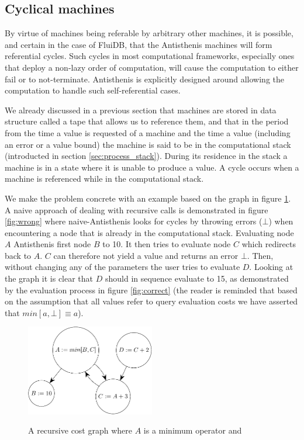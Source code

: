 \subsection{Cyclical machines}
\label{sec:cyclical_machines}

By virtue of machines being referable by arbitrary other machines, it
is possible, and certain in the case of FluiDB, that the Antisthenis
machines will form referential cycles. Such cycles in most
computational frameworks, especially ones that deploy a non-lazy order
of computation, will cause the computation to either fail or to
not-terminate. Antisthenis is explicitly designed around allowing the
computation to handle such self-referential cases.

We already discussed in a previous section that machines are stored in
data structure called a tape that allows us to reference them, and
that in the period from the time a value is requested of a machine and
the time a value (including an error or a value bound) the machine is
said to be in the computational stack (introducted in section
\ref{sec:process_stack}). During its residence in the stack a machine is
in a state where it is unable to produce a value. A cycle occurs when
a machine is referenced while in the computational stack.

We make the problem concrete with an example based on the graph in
figure \ref{fig:recur_package}. A naive approach of dealing with
recursive calls is demonstrated in figure \ref{fig:wrong} where
naive-Antisthenis looks for cycles by throwing errors (\(\bot\)) when
encountering a node that is already in the computational
stack. Evaluating node \(A\) Antisthenis first node \(B\) to 10. It
then tries to evaluate node \(C\) which redirects back to \(A\). \(C\)
can therefore not yield a value and returns an error \(\bot\). Then,
without changing any of the parameters the user tries to evaluate
\(D\). Looking at the graph it is clear that \(D\) should in sequence
evaluate to 15, as demonstrated by the evaluation process in figure
\ref{fig:correct} (the reader is reminded that based on the assumption
that all values refer to query evaluation costs we have asserted that
\(min[a,\bot] \equiv a\)).

\begin{figure}[H]
\centering
\includegraphics[width=0.5\textwidth]{./imgs/recur_package.pdf}
\label{fig:recur_package}
\caption{A recursive cost graph where \(A\) is a minimum operator and}
\end{figure}


